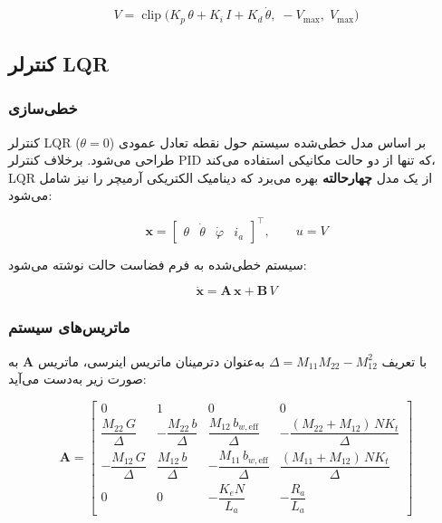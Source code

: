 \begin{equation}
V = \operatorname{clip}\!\big(K_p\,\theta + K_i\,I + K_d\,\dot{\theta},\; -V_{\max},\; V_{\max}\big)
\end{equation}

\subsection{کنترلر LQR}

\subsubsection{خطی‌سازی}

کنترلر LQR بر اساس مدل خطی‌شده سیستم حول نقطه تعادل عمودی ($\theta = 0$) طراحی می‌شود. برخلاف کنترلر PID که تنها از دو حالت مکانیکی استفاده می‌کند، LQR از یک مدل \textbf{چهارحالته} بهره می‌برد که دینامیک الکتریکی آرمیچر را نیز شامل می‌شود:

\begin{equation}
\mathbf{x} = \begin{bmatrix} \theta & \dot{\theta} & \dot{\varphi} & i_a \end{bmatrix}^\top,
\qquad
u = V
\end{equation}

سیستم خطی‌شده به فرم فضاست حالت نوشته می‌شود:

\begin{equation}
\dot{\mathbf{x}} = \mathbf{A}\,\mathbf{x} + \mathbf{B}\,V
\end{equation}

\subsubsection{ماتریس‌های سیستم}

با تعریف $\Delta = M_{11} M_{22} - M_{12}^2$ به‌عنوان دترمینان ماتریس اینرسی، ماتریس $\mathbf{A}$ به صورت زیر به‌دست می‌آید:

\begin{equation}
\mathbf{A} = \begin{bmatrix}
0 & 1 & 0 & 0 \\[6pt]
\dfrac{M_{22}\,G}{\Delta}
& -\dfrac{M_{22}\,b}{\Delta}
& \dfrac{M_{12}\,b_{w,\text{eff}}}{\Delta}
& -\dfrac{(M_{22}+M_{12})\,N K_t}{\Delta} \\[10pt]
-\dfrac{M_{12}\,G}{\Delta}
& \dfrac{M_{12}\,b}{\Delta}
& -\dfrac{M_{11}\,b_{w,\text{eff}}}{\Delta}
& \dfrac{(M_{11}+M_{12})\,N K_t}{\Delta} \\[10pt]
0 & 0 & -\dfrac{K_e N}{L_a} & -\dfrac{R_a}{L_a}
\end{bmatrix}
\end{equation}

